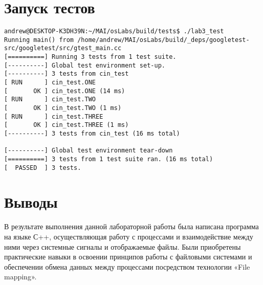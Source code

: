 \documentclass[a4paper, 12pt]{article}
\begin{document}
\newpage
\section{Запуск тестов}
\begin{verbatim}
andrew@DESKTOP-K3DH39N:~/MAI/osLabs/build/tests$ ./lab3_test 
Running main() from /home/andrew/MAI/osLabs/build/_deps/googletest-src/googletest/src/gtest_main.cc
[==========] Running 3 tests from 1 test suite.
[----------] Global test environment set-up.
[----------] 3 tests from cin_test
[ RUN      ] cin_test.ONE
[       OK ] cin_test.ONE (14 ms)
[ RUN      ] cin_test.TWO
[       OK ] cin_test.TWO (1 ms)
[ RUN      ] cin_test.THREE
[       OK ] cin_test.THREE (1 ms)
[----------] 3 tests from cin_test (16 ms total)

[----------] Global test environment tear-down
[==========] 3 tests from 1 test suite ran. (16 ms total)
[  PASSED  ] 3 tests.
\end{verbatim}

\newpage
\section{Выводы}
В результате выполнения данной лабораторной работы была написана программа на языке С++, осуществляющая работу с процессами и взаимодействие между ними через системные сигналы и отображаемые файлы. Были приобретены практические навыки в освоении принципов работы с файловыми системами и обеспечении обмена данных между процессами посредством технологии «File mapping».
\end{document}
